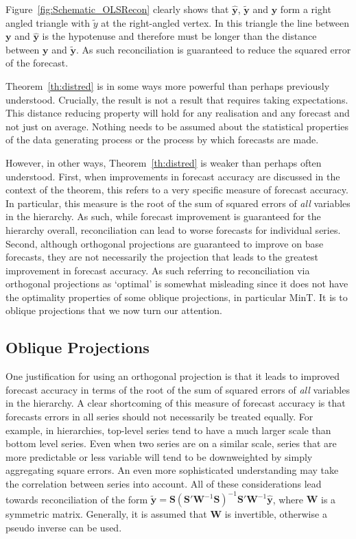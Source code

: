 \documentclass[12pt]{article}
\theoremstyle{definition}
\theoremstyle{property}
\begin{document}
	
	Figure~\ref{fig:Schematic_OLSRecon} clearly shows that $\hat{\bm{y}}$, $\tilde{\bm{y}}$ and $\bm{y}$ form a right angled triangle with $\tilde{y}$ at the right-angled vertex.  In this triangle the line between $\bm{y}$ and $\hat{\bm{y}}$ is the hypotenuse and therefore must be longer than the distance between $\bm{y}$ and $\tilde{\bm{y}}$.  As such reconciliation is guaranteed to reduce the squared error of the forecast.
	
    Theorem~\ref{th:distred} is in some ways more powerful than perhaps previously understood.  Crucially, the result is not a result that requires taking expectations.  This distance reducing property will hold for any realisation and any forecast and not just on average.  Nothing needs to be assumed about the statistical properties of the data generating process or the process by which forecasts are made. 
    
    However, in other ways, Theorem~\ref{th:distred} is weaker than perhaps often understood. First, when improvements in forecast accuracy are discussed in the context of the theorem, this refers to a very specific measure of forecast accuracy.  In particular, this measure is the root of the sum of squared errors of {\em all} variables in the hierarchy.  As such, while forecast improvement is guaranteed for the hierarchy overall, reconciliation can lead to worse forecasts for individual series. Second, although orthogonal projections are guaranteed to improve on base forecasts, they are not necessarily the projection that leads to the greatest improvement in forecast accuracy.  As such referring to reconciliation via orthogonal projections as `optimal' is somewhat misleading since it does not have the optimality properties of some oblique projections, in particular MinT. It is to oblique projections that we now turn our attention.
    	
	\subsection{Oblique Projections}\label{sec:oblique}
	
	One justification for using an orthogonal projection is that it leads to improved forecast accuracy in terms of the root of the sum of squared errors of {\em all} variables in the hierarchy.  A clear shortcoming of this measure of forecast accuracy is that forecasts errors in all series should not necessarily be treated equally.  For example, in hierarchies, top-level series tend to have a much larger scale than bottom level series.  Even when two series are on a similar scale, series that are more predictable or less variable will tend to be downweighted by simply aggregating square errors.  An even more sophisticated understanding may take the correlation between series into account.  All of these considerations lead towards reconciliation of the form $\tilde{\bm{y}}=\bm{S}\left(\bm{S}'\bm{W}^{-1}\bm{S}\right)^{-1}\bm{S}'\bm{W}^{-1}\hat{\bm{y}}$, where $\bm{W}$ is a symmetric matrix.  Generally, it is assumed that $\bm{W}$ is invertible, otherwise a pseudo inverse can be used.
	
\end{document}
